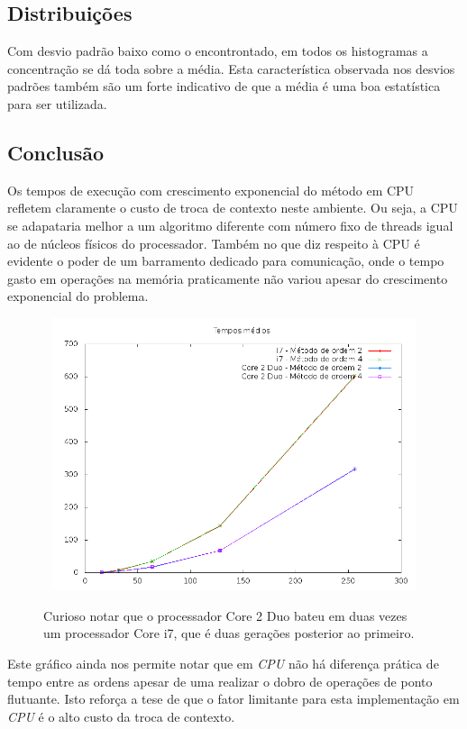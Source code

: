  \subsection{Distribuições}
    Com desvio padrão baixo como o encontrontado, em todos os histogramas a concentração se dá toda sobre a média. Esta característica observada nos desvios padrões também são um forte indicativo de que a média é uma boa estatística para ser utilizada.    
  
  \subsection{Conclusão}
  Os tempos de execução com crescimento exponencial do método em CPU refletem claramente o custo de troca de contexto neste ambiente. Ou seja, a CPU se adapataria melhor a um algoritmo diferente com número fixo de threads igual ao de núcleos físicos do processador. Também no que diz respeito à CPU é evidente o poder de um barramento dedicado para comunicação, onde o tempo gasto em operações na memória praticamente não variou apesar do crescimento exponencial do problema.
  
  \begin{figure}[!h]
    \begin{center}
       \includegraphics[width=120mm, height=80mm]{images/cpu-means.png}
       \label{fig:cpu-means}
       \caption{Curioso notar que o processador Core 2 Duo bateu em duas vezes um processador Core i7, que é duas gerações posterior ao primeiro.}
    \end{center}
  \end{figure}
  
  Este gráfico ainda nos permite notar que em \textit{CPU} não há diferença prática de tempo entre as ordens apesar de uma realizar o dobro de operações de ponto flutuante. Isto reforça a tese de que o fator limitante para esta implementação em \textit{CPU} é o alto custo da troca de contexto.
  
